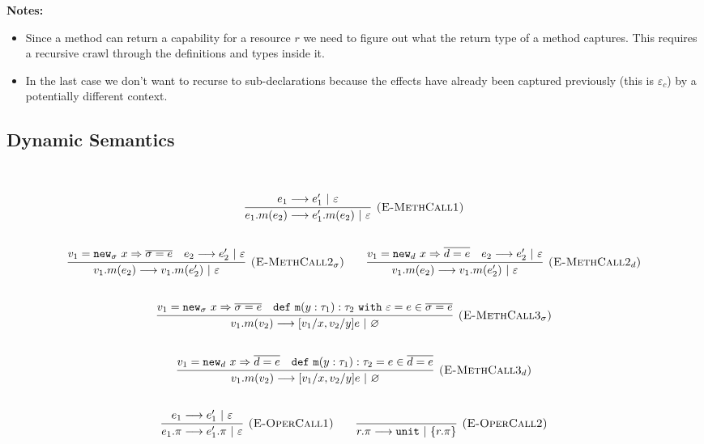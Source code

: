 \documentclass{llncs}
\newcommand{\keywadj}[1]{\mathtt{#1}}
\newcommand{\keyw}[1]{\keywadj{#1}~}
\newcommand{\newd}[0]{
	\keywadj{new}_d~x \Rightarrow \overline{d = e}
}
\newcommand{\newsig}[0]{
	\keywadj{new}_\sigma~x \Rightarrow \overline{\sigma = e}
}
\begin{document}
\noindent \textbf{Notes:}
\begin{itemize}
	\item Since a method can return a capability for a resource $r$ we need to figure out what the return type of a method captures. This requires a recursive crawl through the definitions and types inside it.
	\item In the last case we don't want to recurse to sub-declarations because the effects have already been captured previously (this is $\varepsilon_c$) by a potentially different context.
\end{itemize}

\subsection{Dynamic Semantics}

~\\
\noindent
{}

\[
\begin{array}{c}

	\infer[\textsc{(E-MethCall1)}]
		{e_1.m(e_2) \longrightarrow e_1'.m(e_2)~|~\varepsilon}
		{e_1 \longrightarrow e_1'~|~\varepsilon} \\[5ex]

	\infer[\textsc{(E-MethCall2$_{\sigma}$)}]
		{v_1.m(e_2) \longrightarrow v_1.m(e_2')~|~\varepsilon}
		{v_1 = \newsig & e_2 \longrightarrow e_2'~|~\varepsilon} ~~~~~~
		
	\infer[\textsc{(E-MethCall2$_d$)}]
		{v_1.m(e_2) \longrightarrow v_1.m(e_2')~|~\varepsilon}
		{v_1 = \newd & e_2 \longrightarrow e_2'~|~\varepsilon}\\[5ex]
				
	\infer[\textsc{(E-MethCall3$_{\sigma}$)}]
		{v_1.m(v_2)
			\longrightarrow
		 [v_1/x, v_2/y]e~|~\varnothing}
  		{v_1 = \newsig & \keywadj{def~m}(y: \tau_1) : \tau_2~\keyw{with} \varepsilon = e \in \overline {\sigma = e}} \\[5ex]

	\infer[\textsc{(E-MethCall3$_d$)}]
		{v_1.m(v_2)
			\longrightarrow
		 [v_1/x, v_2/y]e~|~\varnothing}
  		{v_1 = \newd & \keywadj{def~m}(y: \tau_1) : \tau_2 = e \in \overline {d = e}} \\[5ex]

	\infer[\textsc{(E-OperCall1)}]
		{e_1.\pi
			\longrightarrow
		 e_1'.\pi~|~\varepsilon}
		{e_1 \longrightarrow e_1'~|~\varepsilon}
~~~~~~

			\infer[\textsc{(E-OperCall2)}]
		{r.\pi
			\longrightarrow
		 \keywadj{unit}~|~\{r.\pi\}}
		{} \\[5ex]
			
\end{array}
\]
\noindent
{}
\end{document}
